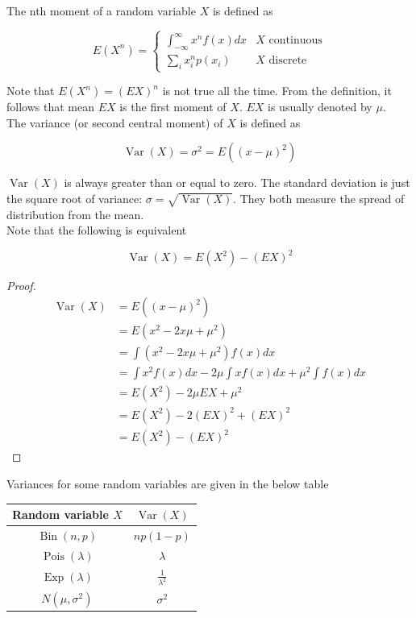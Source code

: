\documentclass[12pt, a4paper]{article}
\newcommand{\Pois}{\operatorname{Pois}}
\newcommand{\Var}{\operatorname{Var}}
\newcommand{\Bin}{\operatorname{Bin}}
\newcommand{\Exp}{\operatorname{Exp}}
\begin{document}
The nth moment of a random variable $X$ is defined as

\[ E(X^n)=\begin{cases} \displaystyle\int_{-\infty}^\infty x^n f(x) dx & \text{$X$ continuous} \\[20pt] \displaystyle\sum_i x_i^n p(x_i) & \text{$X$ discrete} \end{cases} \]

Note that $E(X^n) = (EX)^n$ is not true all the time. From the definition, it follows that mean $EX$ is the first moment of $X$. $EX$ is usually denoted by $\mu$. \\

The variance (or second central moment) of $X$ is defined as

\[ \Var(X)=\sigma^2=E((x-\mu)^2) \]

$\Var(X)$ is always greater than or equal to zero. The standard deviation is just the square root of variance: $\sigma=\sqrt{\Var(X)}$. They both measure the spread of distribution from the mean. \\

Note that the following is equivalent

\[ \Var(X)=E(X^2)-(EX)^2 \]

\begin{proof}
\begin{align*}
\Var(X)&=E((x-\mu)^2) \\
&=E(x^2-2x\mu+\mu^2) \\
&=\int (x^2-2x\mu+\mu^2) f(x) dx \\
&=\int x^2 f(x) dx -2\mu\int xf(x) dx + \mu^2 \int f(x) dx \\
&=E(X^2)-2\mu EX + \mu^2 \\
&=E(X^2)-2(EX)^2+(EX)^2 \\
&=E(X^2)-(EX)^2
\end{align*}
\end{proof}

Variances for some random variables are given in the below table

\begin{center}
\begin{tabular}{| c | c |}
\hline
Random variable $X$ & $\Var(X)$ \\
\hline
$\Bin(n,p)$ & $np(1-p)$ \\
\hline
$\Pois(\lambda)$ & $\lambda$ \\
\hline
$\Exp(\lambda)$ & $\frac{1}{\lambda^2}$ \\
\hline
$N(\mu,\sigma^2)$ & $\sigma^2$ \\
\hline
\end{tabular}
\end{center}
\end{document}
